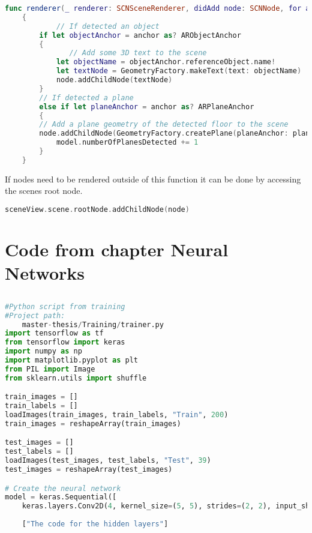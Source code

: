 \begin{appendices}
\begin{lstlisting}[language=swift]
func renderer(_ renderer: SCNSceneRenderer, didAdd node: SCNNode, for anchor: ARAnchor)
    {
    	    // If detected an object
        if let objectAnchor = anchor as? ARObjectAnchor
        {
        	   // Add some 3D text to the scene
            let objectName = objectAnchor.referenceObject.name!
            let textNode = GeometryFactory.makeText(text: objectName)
            node.addChildNode(textNode)
        }
        // If detected a plane
        else if let planeAnchor = anchor as? ARPlaneAnchor
        {
        // Add a plane geometry of the detected floor to the scene
        node.addChildNode(GeometryFactory.createPlane(planeAnchor: planeAnchor, metalDevice: metalDevice!))
            model.numberOfPlanesDetected += 1
        }
    }
\end{lstlisting}

If nodes need to be rendered outside of this function it can be done by accessing the
scenes root node.

\begin{lstlisting}[language=swift]
sceneView.scene.rootNode.addChildNode(node)
\end{lstlisting}

\chapter{Code from chapter Neural Networks}
\section{}
\begin{lstlisting}[language=python]
#Python script from training
#Project path:
	master-thesis/Training/trainer.py
import tensorflow as tf
from tensorflow import keras
import numpy as np
import matplotlib.pyplot as plt
from PIL import Image
from sklearn.utils import shuffle

train_images = []
train_labels = []
loadImages(train_images, train_labels, "Train", 200)
train_images = reshapeArray(train_images)

test_images = []
test_labels = []
loadImages(test_images, test_labels, "Test", 39)
test_images = reshapeArray(test_images)

# Create the neural network
model = keras.Sequential([
	keras.layers.Conv2D(4, kernel_size=(5, 5), strides=(2, 2), input_shape=(image_height, image_width, number_of_color_channels)),
		
	["The code for the hidden layers"]


\end{lstlisting}
\end{appendices}
